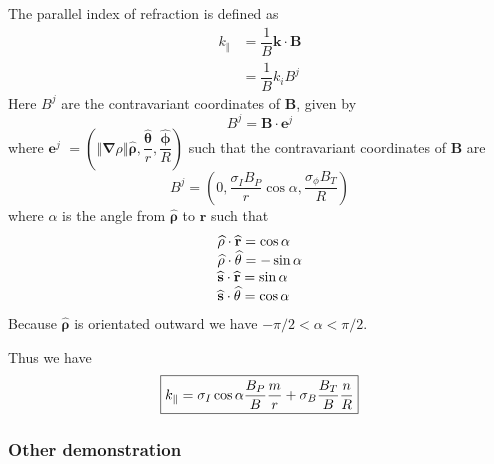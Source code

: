 \documentclass[a4paper,12pt]{article}%
\begin{document}
The parallel index of refraction is defined as%
\begin{align}
k_{\Vert}  &  =\dfrac{1}{B}\mathbf{k}\cdot\mathbf{B}\\
&  =\dfrac{1}{B}k_{i}B^{j}%
\end{align}
Here $B^{j}$ are the contravariant coordinates of $\mathbf{B}$, given by%
\begin{equation}
B^{j}=\mathbf{B}\cdot\mathbf{e}^{j}%
\end{equation}
where $\mathbf{e}^{j}$ $=\left(  \left\Vert \mathbf{\nabla}\rho\right\Vert
\widehat{\mathbf{\rho}},\dfrac{\widehat{\mathbf{\theta}}}{r},\dfrac
{\widehat{\mathbf{\phi}}}{R}\right)  $ such that the contravariant coordinates
of $\mathbf{B}$ are
\begin{equation}
B^{j}=\left(  0,\dfrac{\sigma_{I}B_{P}}{r}\cos\alpha,\dfrac{\sigma_{\phi}%
B_{T}}{R}\right)
\end{equation}
where $\alpha$ is the angle from $\widehat{\mathbf{\rho}}$ to $\widehat
{\mathbf{r}}$ such that%
\begin{equation}%
\begin{array}
[c]{l}%
\widehat{\mathbf{\rho}}\cdot\widehat{\mathbf{r}}=\cos\alpha\\
\widehat{\mathbf{\rho}}\cdot\widehat{\mathbf{\theta}}=-\sin\alpha\\
\widehat{\mathbf{s}}\cdot\widehat{\mathbf{r}}=\sin\alpha\\
\widehat{\mathbf{s}}\cdot\widehat{\mathbf{\theta}}=\cos\alpha
\end{array}
\end{equation}
Because $\widehat{\mathbf{\rho}}$ is orientated outward we have $-\pi
/2<\alpha<\pi/2$.

Thus we have%
\begin{equation}
\fbox{$k_{\Vert}=\sigma_{I}\cos\alpha\dfrac{B_{P}}{B}\dfrac{m}{r}+\sigma
_{B}\dfrac{B_{T}}{B}\dfrac{n}{R}$}%
\end{equation}


\subsubsection{Other demonstration}
\end{document}
